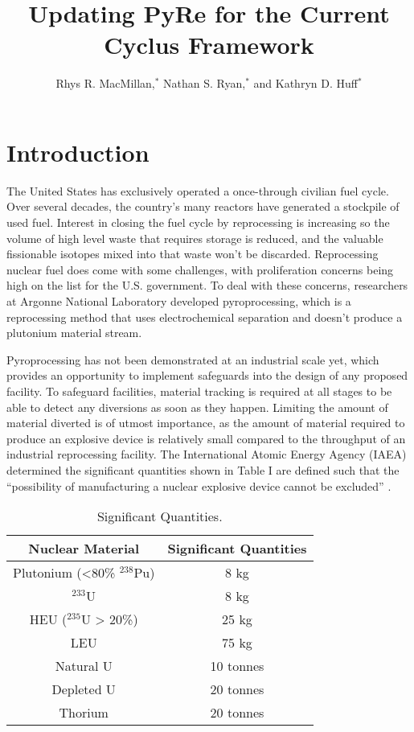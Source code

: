 \documentclass{anstrans}
\title{Updating PyRe for the Current Cyclus Framework}
\author{Rhys R. MacMillan,$^{*}$ Nathan S. Ryan,$^{*}$ and Kathryn D. Huff$^{*}$}
\institute{
$^{*}$Advanced Reactors and Fuel Cycles Group, University of Illinois, Urbana IL, rhysrm2@illinois.edu
}
\begin{document}
\section{Introduction}
The United States has exclusively operated a once-through civilian fuel cycle. 
Over several decades, the country’s many reactors have generated a stockpile of used fuel. Interest in closing the fuel cycle by reprocessing is increasing so the volume of high level waste that requires storage is reduced, and the valuable fissionable isotopes mixed into that waste won’t be discarded. Reprocessing nuclear fuel does come with some challenges, with proliferation concerns being high on the list for the U.S. government. To deal with these concerns, researchers at Argonne National Laboratory developed pyroprocessing, which is a reprocessing method that uses electrochemical separation and doesn’t produce a plutonium material stream. 

Pyroprocessing has not been demonstrated at an industrial scale yet, which provides an opportunity to implement safeguards into the design of any proposed facility. To safeguard facilities, material tracking is required at all stages to be able to detect any diversions as soon as they happen. Limiting the amount of material diverted is of utmost importance, as the amount of material required to produce an explosive device is relatively small compared to the throughput of an industrial reprocessing facility. The International Atomic Energy Agency (IAEA) determined the significant quantities shown in Table I are defined such that the “possibility of manufacturing a nuclear explosive device cannot be excluded” \cite{schanfein_iaea_2021}.

\begin{table}[H]
  \centering
  \caption{Significant Quantities.}
  \label{tab:deployment_schemes}
  \begin{tabular}{c c}
    \hline
    Nuclear Material&Significant Quantities\\
    \hline
    Plutonium (<80\% $^{238}$Pu)&8 kg\\
    $^{233}$U&8 kg\\
    HEU ($^{235}$U > 20\%)&25 kg\\
    LEU&75 kg\\
    Natural U&10 tonnes\\
    Depleted U&20 tonnes\\
    Thorium&20 tonnes\\
    \hline
  \end{tabular}
\end{table}
\end{document}

